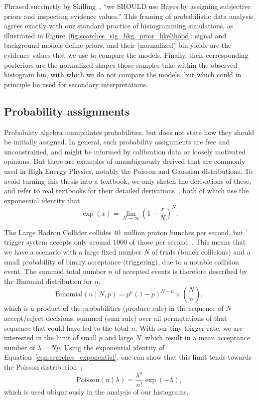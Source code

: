 Phrased succinctly by Skilling~\cite{skilling2008rant},
``we SHOULD use Bayes by assigning subjective priors and inspecting evidence
values.''
This framing of probabilistic data analysis agrees exactly with our standard
practice of histogramming simulations,
as illustrated in Figure~\ref{fig:searches_sig_bkg_prior_likelihood}:
signal and background models define priors, and their (normalized) bin yields
are the evidence values that we use to compare the models.
Finally, their corresponding posteriors are the normalized shapes those samples
take within the observed histogram bin, with which we do not compare the
models, but which could in principle be used for secondary interpretations.

\subsection{Probability assignments}
Probability algebra manipulates probabilities, but does not state how they
should be initially assigned.
In general, such probability assignments are free and unconstrained, and might
be informed by calibration data or loosely motivated opinions.
But there are examples of unambiguously derived that are commonly used in
High-Energy Physics, notably the Poisson and Gaussian distributions.
To avoid turning this thesis into a textbook, we only sketch the derivations
of these, and refer to real textbooks for their detailed
derivations~\cite{jaynes2003probability}, both of which use the exponential
identity that
\begin{equation}
\label{eqn:searches_exponential}
\exp(x) = \displaystyle \lim_{N \to \infty}
\left(1 - \frac{x}{N}\right)^N
.
\end{equation}

The Large Hadron Collider collides $40$~million proton bunches per second,
but \atlas' trigger system accepts only around $1000$ of
those per second~\cite{atlas2020trigger}.
This means that we have a scenario with a large fixed number $N$ of trials
(bunch collisions)
and a small probability of binary acceptance (triggering),
due to a notable collision event.
The summed total number $n$ of accepted events is therefore described by the
Binomial distribution for $n$;
\begin{equation}
\mathrm{Binomial}(n\mid N, p) = p^n (1 - p)^{N - n} \times \binom{N}{n}
,
\end{equation}
which is a product of the probabilities (produce rule) in the sequence of $N$
accept/reject decisions, summed (sum rule) over all permutations of that sequence
that could have led to the total $n$.
With our tiny trigger rate, we are interested in the limit of small
$p$ and large $N$, which result in a mean acceptance number of $\lambda = Np$.
Using the exponential identity of Equation~\ref{eqn:searches_exponential}, one
can show that this limit tends towards the Poisson
distribution~\cite{jaynes2003probability};
\begin{equation}
\label{eqn:searches_poisson}
\mathrm{Poisson}(n\mid \lambda) = \frac{\lambda^n}{n!}\exp(-\lambda)
,
\end{equation}
which is used ubiquitously in the analysis of our histograms.

